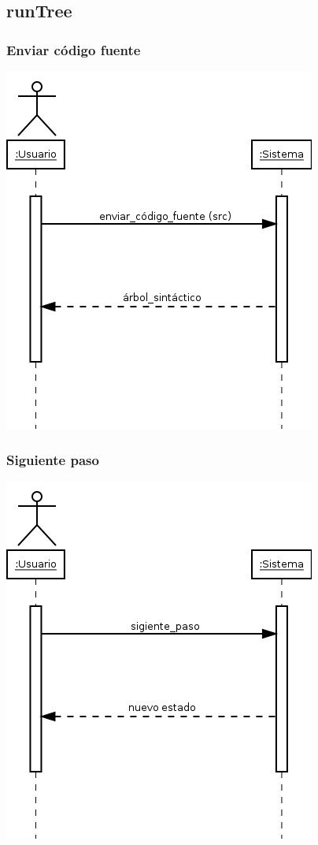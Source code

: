 \subsection{runTree}
\subsubsection{Enviar código fuente}
\begin{center}
\includegraphics[scale=0.4]{enviar_codigo_fuente.png} \\
\end{center}
\subsubsection{Siguiente paso}
\begin{center}
\includegraphics[scale=0.4]{siguiente_paso.png} \\
\end{center}

